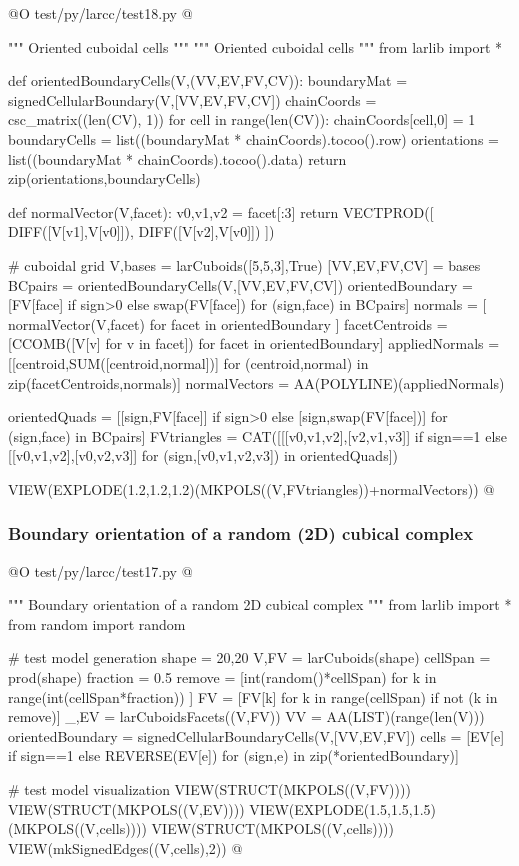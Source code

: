 \documentclass[11pt,oneside]{article}    %
\begin{document}
@O test/py/larcc/test18.py
@{""" Oriented cuboidal cells """
""" Oriented cuboidal cells """
from larlib import *

def orientedBoundaryCells(V,(VV,EV,FV,CV)):
    boundaryMat = signedCellularBoundary(V,[VV,EV,FV,CV])
    chainCoords = csc_matrix((len(CV), 1))
    for cell in range(len(CV)): chainCoords[cell,0] = 1
    boundaryCells = list((boundaryMat * chainCoords).tocoo().row)
    orientations = list((boundaryMat * chainCoords).tocoo().data)
    return zip(orientations,boundaryCells)

def normalVector(V,facet):
    v0,v1,v2 = facet[:3]
    return VECTPROD([ DIFF([V[v1],V[v0]]), DIFF([V[v2],V[v0]]) ])

# cuboidal grid
V,bases = larCuboids([5,5,3],True)
[VV,EV,FV,CV] = bases
BCpairs = orientedBoundaryCells(V,[VV,EV,FV,CV])
orientedBoundary = [FV[face] if sign>0 else swap(FV[face]) for (sign,face) in BCpairs]
normals = [ normalVector(V,facet)  for facet in orientedBoundary ]
facetCentroids = [CCOMB([V[v] for v in facet]) for facet in orientedBoundary]
appliedNormals = [[centroid,SUM([centroid,normal])] for (centroid,normal) in zip(facetCentroids,normals)]
normalVectors = AA(POLYLINE)(appliedNormals)

orientedQuads = [[sign,FV[face]] if sign>0 else [sign,swap(FV[face])] for (sign,face) in BCpairs]
FVtriangles = CAT([[[v0,v1,v2],[v2,v1,v3]] if sign==1 else [[v0,v1,v2],[v0,v2,v3]]
            for (sign,[v0,v1,v2,v3]) in orientedQuads])

VIEW(EXPLODE(1.2,1.2,1.2)(MKPOLS((V,FVtriangles))+normalVectors))
@}





\subsubsection{Boundary orientation of a random (2D) cubical complex}

@O test/py/larcc/test17.py
@{""" Boundary orientation of a random 2D cubical complex """
from larlib import *
from random import random

# test model generation
shape = 20,20
V,FV = larCuboids(shape)
cellSpan = prod(shape)
fraction = 0.5
remove = [int(random()*cellSpan) for k in range(int(cellSpan*fraction)) ]
FV = [FV[k] for k in range(cellSpan) if not (k in remove)]
_,EV = larCuboidsFacets((V,FV))
VV = AA(LIST)(range(len(V)))
orientedBoundary = signedCellularBoundaryCells(V,[VV,EV,FV])
cells = [EV[e] if sign==1 else REVERSE(EV[e]) for (sign,e) in zip(*orientedBoundary)]

# test model visualization
VIEW(STRUCT(MKPOLS((V,FV))))
VIEW(STRUCT(MKPOLS((V,EV))))
VIEW(EXPLODE(1.5,1.5,1.5)(MKPOLS((V,cells))))
VIEW(STRUCT(MKPOLS((V,cells))))
VIEW(mkSignedEdges((V,cells),2))
@}
\end{document}
